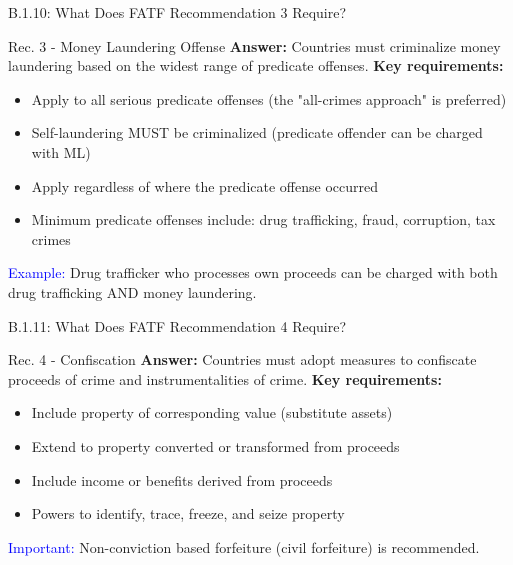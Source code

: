 \documentclass{beamer}
\begin{document}
	\begin{frame}{B.1.10: What Does FATF Recommendation 3 Require?}
		\begin{block}{Rec. 3 - Money Laundering Offense}
			\textbf{Answer:} Countries must criminalize money laundering based on the widest range of predicate offenses.
			\vspace{0.2cm}
			\textbf{Key requirements:}
			\begin{itemize}
				\item Apply to all serious predicate offenses (the "all-crimes approach" is preferred)
				\item Self-laundering MUST be criminalized (predicate offender can be charged with ML)
				\item Apply regardless of where the predicate offense occurred
				\item Minimum predicate offenses include: drug trafficking, fraud, corruption, tax crimes
			\end{itemize}
			\textcolor{blue}{Example:} Drug trafficker who processes own proceeds can be charged with both drug trafficking AND money laundering.
		\end{block}
	\end{frame}
	
	\begin{frame}{B.1.11: What Does FATF Recommendation 4 Require?}
		\begin{block}{Rec. 4 - Confiscation}
			\textbf{Answer:} Countries must adopt measures to confiscate proceeds of crime and instrumentalities of crime.
			\vspace{0.2cm}
			\textbf{Key requirements:}
			\begin{itemize}
				\item Include property of corresponding value (substitute assets)
				\item Extend to property converted or transformed from proceeds
				\item Include income or benefits derived from proceeds
				\item Powers to identify, trace, freeze, and seize property
			\end{itemize}
			\textcolor{blue}{Important:} Non-conviction based forfeiture (civil forfeiture) is recommended.
		\end{block}
	\end{frame}
	
\end{document}
